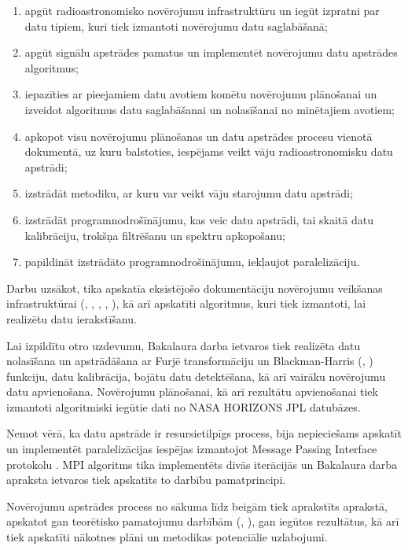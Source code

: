 \begin{enumerate}
    \item apgūt radioastronomisko novērojumu infrastruktūru un iegūt izpratni par datu tipiem, kuri tiek izmantoti novērojumu datu saglabāšanā;
    \item apgūt signālu apstrādes pamatus un implementēt novērojumu datu apstrādes algoritmus;
    \item iepazīties ar pieejamiem datu avotiem komētu novērojumu plānošanai un izveidot algoritmus datu saglabāšanai un nolasīšanai no minētajiem avotiem;
    \item apkopot visu novērojumu plānošanas un datu apstrādes procesu vienotā dokumentā, uz kuru balstoties, iespējams veikt vāju radioastronomisku datu apstrādi;
    \item izstrādāt metodiku, ar kuru var veikt vāju starojumu datu apstrādi;
    \item izstrādāt programnodrošīnājumu, kas veic datu apstrādi, tai skaitā datu kalibrāciju, trokšņa filtrēšanu un spektru apkopošanu;
    \item papildināt izstrādāto programnodrošinājumu, iekļaujot paralelizāciju.
\end{enumerate}

Darbu uzsākot, tika apskatīa eksistējošo dokumentāciju novērojumu veikšanas infrastruktūrai (\cite{telescope-spec}, \cite{sdrspec},  \cite{vlsr}, \cite{telescope-sefd}, \cite{nancay}), kā arī apskatīti algoritmus, kuri tiek izmantoti, lai realizētu datu ierakstīšanu.

Lai izpildītu otro uzdevumu, Bakalaura darba ietvaros tiek realizēta datu nolasīšana un apstrādāšana ar Furjē transformāciju un Blackman-Harris (\cite{overlapping}, \cite{blackman-harris}) funkciju, datu kalibrācija, bojātu datu detektēšana, kā arī vairāku novērojumu datu apvienošana. Novērojumu plānošanai, kā arī rezultātu apvienošanai tiek izmantoti algoritmiski iegūtie dati no NASA HORIZONS JPL \cite{horizons} datubāzes.

Ņemot vērā, ka datu apstrāde ir resursietilpīgs process, bija nepieciešams apskatīt un implementēt paralelizācijas iespējas izmantojot Message Passing Interface protokolu \cite{mpi-docs}. MPI algoritms tika implementēts divās iterācijās un Bakalaura darba apraksta ietvaros tiek apskatīts to darbību pamatprincipi.

Novērojumu apstrādes process no sākuma līdz beigām tiek aprakstīts aprakstā, apskatot gan teorētisko pamatojumu darbībām (\cite{kepler-elements}, \cite{unbiased}), gan iegūtos rezultātus, kā arī tiek apskatīti nākotnes plāni un metodikas potenciālie uzlabojumi. 


